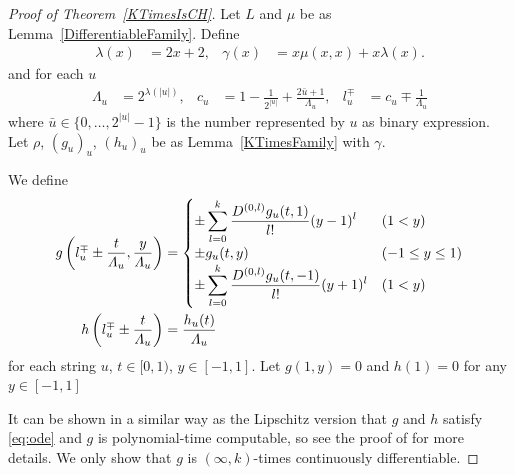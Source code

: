\begin{proof}[Proof of Theorem~\ref{KTimesIsCH}]
Let $L$ and $\mu$ be as Lemma~\ref{DifferentiableFamily}.
Define
 \begin{align}
  \lambda(x) &= 2x + 2,&
  \gamma(x) &= x \mu(x, x) + x \lambda(x).
 \end{align}
and for each $u$
\begin{align}
 \Lambda_u 
 &= 2^{\lambda(|u|)}, &
 c_u 
 &= 1-\frac{1}{2^{|u|}}+\frac{2\bar{u}+1}{\Lambda_u}, &
 l_u^\mp 
 &= c_u\mp\frac{1}{\Lambda_u}
\end{align}  
 where $\bar u \in \{0, \dots, 2^{|u|} - 1\}$ is the number represented by $u$ as binary expression.
Let $\rho$, $(g_u)_u$, $(h_u)_u$ be as Lemma~\ref{KTimesFamily} with $\gamma$.

We define
 \begin{align} \label{eq:g}
 g \left(l^\mp_u \pm \frac{t}{\varLambda_u}, \frac{y}{\varLambda_u}\right)
  &= \begin{cases}
      \pm \displaystyle \sum_{l=0}^k \frac{D^{(0,l)}g_u(t,1)}{l!} (y-1)^l 
      &  (1<y) \\
      \pm g_u(t, y)      & (-1 \le y \le 1) \\
      \pm \displaystyle \sum_{l=0}^k \frac{D^{(0,l)}g_u(t,-1)}{l!} (y+1)^l  
      &  (1<y) \\
    \end{cases} 
  \\
 h \left( l^\mp_u \pm \frac{t}{\varLambda_u} \right) 
  & = \frac{h_u(t)}{\varLambda_u}
\end{align}
for each string $u$, $t \in [0,1)$, $y \in [-1, 1]$.
Let $g(1,y) = 0$ and $h(1) = 0$ for any $y \in [-1,1]$

It can be shown in a similar way as the Lipschitz version 
that $g$ and $h$ satisfy \eqref{eq:ode} and $g$ is polynomial-time computable,
so see the proof of \cite[Theorem 3.2]{kawamura2010lipschitz} for more details.
We only show that $g$ is $(\infty, k)$-times continuously differentiable.


\end{proof}
